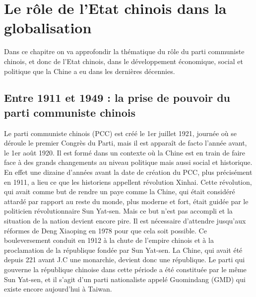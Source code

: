 \section{Le rôle de l’Etat chinois dans la globalisation}
Dans ce chapitre on va approfondir la thématique du rôle du parti communiste chinois, et donc de l’Etat chinois, dans le développement économique, social et politique que la Chine a eu dans les dernières décennies. 
\subsection{Entre 1911 et 1949 : la prise de pouvoir du parti communiste chinois}
Le parti communiste chinois (PCC) est créé le 1er juillet 1921, journée où se déroule le premier Congrès du Parti, mais il est apparaît de facto l’année avant, le 1er août 1920. Il est formé dans un contexte où la Chine est en train de faire face à des grands changements au niveau politique mais aussi social et historique. En effet une dizaine d’années avant la date de création du PCC, plus précisément en 1911, a lieu ce que les historiens appellent révolution Xinhai. Cette révolution, qui avait comme but de rendre un paye comme la Chine, qui était considéré attardé par rapport au reste du monde, plus moderne et fort, était guidée par le politicien révolutionnaire Sun Yat-sen. Mais ce but n’est pas accompli et la situation de la nation devient encore pire. Il est nécessaire d’attendre jusqu’aux réformes de Deng Xiaoping en 1978 pour que cela soit possible. Ce bouleversement conduit en 1912 à la chute de l’empire chinois et à la proclamation de la république fondée par Sun Yat-sen. La Chine, qui avait été depuis 221 avant J.C une monarchie, devient donc une république. Le parti qui gouverne la république chinoise dans cette période a été constituée par le même Sun Yat-sen,  et il s’agit d’un parti nationaliste appelé Guomindang (GMD) qui existe encore aujourd’hui à Taiwan. 
